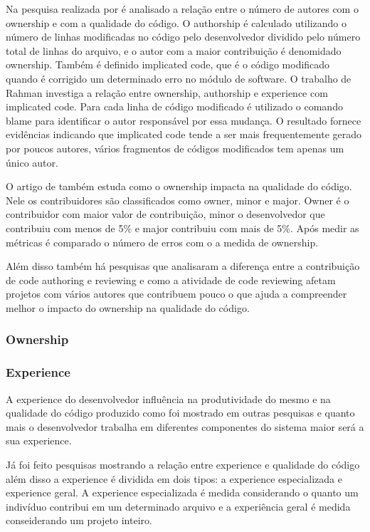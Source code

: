 Na pesquisa realizada por  é analisado a relação entre o número de autores com o ownership e com a qualidade do código. O authorship é calculado utilizando o número de linhas modificadas no código pelo desenvolvedor dividido pelo número total de linhas do arquivo, e o autor com a maior contribuição é denomidado ownership. Também é definido implicated code, que é o código modificado quando é corrigido um determinado erro no módulo de software. O trabalho de Rahman investiga a relação entre ownership, authorship e experience com implicated code. Para cada linha de código modificado é utilizado o comando blame para identificar o autor responsável por essa mudança. O resultado fornece evidências indicando que implicated code tende a ser mais frequentemente gerado por poucos autores, vários fragmentos de códigos modificados tem apenas um único autor.

O artigo de  também estuda como o ownership impacta na qualidade do código. Nele os contribuidores são classificados como owner, minor e major. Owner é o contribuidor com maior valor de contribuição, minor o desenvolvedor que contribuiu com menos de 5\% e major contribuiu com mais de 5\%. Após medir as métricas é comparado o número de erros com o a medida de ownership.

Além disso também há pesquisas\cite{Thongtanunam} que analisaram a diferença entre a contribuição de code authoring e reviewing e como a atividade de code reviewing afetam projetos com vários autores que contribuem pouco o que ajuda a compreender melhor o impacto do ownership na qualidade do código.

\subsubsection{Ownership}

\subsubsection{Experience}
A experience do desenvolvedor influência na produtividade do mesmo e na qualidade do código produzido como foi mostrado em outras pesquisas\cite{Rahman2011}\cite{10.2307/2634607} e quanto mais o desenvolvedor trabalha em diferentes componentes do sistema maior será a sua experience.

Já foi feito pesquisas\cite{Rahman2011} mostrando a relação entre experience e qualidade do código além disso a experience é dividida em dois tipos: a experience especializada e experience geral. A experience especializada é medida considerando o quanto um indivíduo contribui em um determinado arquivo e a experiência geral é medida conseiderando um projeto inteiro.


